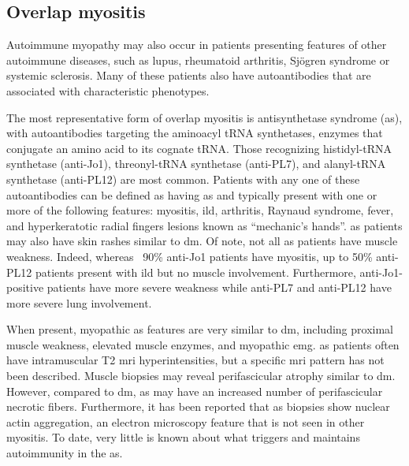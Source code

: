 \subsection{Overlap myositis}

Autoimmune myopathy may also occur in patients presenting features of other autoimmune diseases, such as lupus, rheumatoid arthritis, Sjögren syndrome or systemic sclerosis.\cite{GuillenDelCastillo2014,Rigolet2012,EscolaVerge2017} Many of these patients also have autoantibodies that are associated with characteristic phenotypes.\cite{GuillenDelCastillo2014,Rigolet2012,EscolaVerge2017}

The most representative form of overlap myositis is antisynthetase syndrome (\gls{as}), with autoantibodies targeting the aminoacyl tRNA synthetases, enzymes that conjugate an amino acid to its cognate tRNA.\cite{PinalFernandez2017a,TralleroAraguas2016} Those recognizing histidyl-tRNA synthetase (anti-Jo1), threonyl-tRNA synthetase (anti-PL7), and alanyl-tRNA synthetase (anti-PL12) are most common.\cite{PinalFernandez2017a,TralleroAraguas2016} Patients with any one of these autoantibodies can be defined as having \gls{as} and typically present with one or more of the following features: myositis, \gls{ild}, arthritis, Raynaud syndrome, fever, and hyperkeratotic radial fingers lesions known as “mechanic’s hands”.\cite{SelvaOCallaghan2018} \gls{as} patients may also have skin rashes similar to \gls{dm}.\cite{SelvaOCallaghan2018} Of note, not all \gls{as} patients have muscle weakness. Indeed, whereas ~90\% anti-Jo1 patients have myositis, up to 50\% anti-PL12 patients present with \gls{ild} but no muscle involvement.\cite{PinalFernandez2017a} Furthermore, anti-Jo1-positive patients have more severe weakness while anti-PL7 and anti-PL12 have more severe lung involvement.\cite{PinalFernandez2017a,TralleroAraguas2016}

When present, myopathic \gls{as} features are very similar to \gls{dm}, including proximal muscle weakness, elevated muscle enzymes, and myopathic \gls{emg}.\cite{SelvaOCallaghan2018} \gls{as} patients often have intramuscular T2 \gls{mri} hyperintensities, but a specific \gls{mri} pattern has not been described.\cite{Andersson2017} Muscle biopsies may reveal perifascicular atrophy similar to \gls{dm}. However, compared to \gls{dm}, \gls{as} may have an increased number of perifascicular necrotic fibers.\cite{MescamMancini2015,Noguchi2017} Furthermore, it has been reported that \gls{as} biopsies show nuclear actin aggregation, an electron microscopy feature that is not seen in other myositis.\cite{Stenzel2015} To date, very little is known about what triggers and maintains autoimmunity in the \gls{as}.

